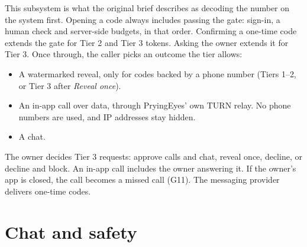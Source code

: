 This subsystem is what the original brief describes as decoding the number on the system first. Opening a code always includes passing the gate: sign-in, a human check and server-side budgets, in that order. Confirming a one-time code extends the gate for Tier 2 and Tier 3 tokens. Asking the owner extends it for Tier 3. Once through, the caller picks an outcome the tier allows:
\begin{itemize}
  \item A watermarked reveal, only for codes backed by a phone number (Tiers 1--2, or Tier 3 after \emph{Reveal once}).
  \item An in-app call over data, through PryingEyes' own TURN relay. No phone numbers are used, and IP addresses stay hidden.
  \item A chat.
\end{itemize}
The owner decides Tier 3 requests: approve calls and chat, reveal once, decline, or decline and block. An in-app call includes the owner answering it. If the owner's app is closed, the call becomes a missed call (G11). The messaging provider delivers one-time codes.

\section{Chat and safety}
\label{sec:uc-chat}

